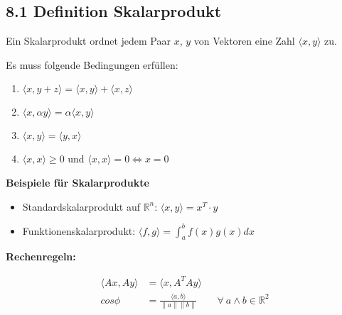 \subsection{8.1 Definition Skalarprodukt}{
\vskip1pt
Ein Skalarprodukt ordnet jedem Paar $x$, $y$ von Vektoren eine Zahl $\langle x, y \rangle$ zu. \par
\vskip5pt

Es muss folgende Bedingungen erfüllen:
\vspace{-1pt}
\begin{center}
\begin{minipage}[t]{0.8 \columnwidth}
\begin{enumerate}[label=\protect\circled{\arabic*}]
\item $\langle x, y + z \rangle = \langle x, y \rangle + \langle x, z \rangle$
\item $\langle x, \alpha y \rangle = \alpha \langle x, y \rangle$
\item $\langle x, y \rangle = \langle y, x \rangle$
\item $\langle x, x \rangle \geq 0$ und $\langle x, x \rangle = 0 \Leftrightarrow x = 0$
\end{enumerate}
\end{minipage}
\end{center}


\vskip4pt
\textbf{Beispiele für Skalarprodukte}
\begin{itemize}[leftmargin=0.29cm, itemsep=0.5pt]
\item Standardskalarprodukt auf $\mathbb{R}^n$: $\langle x, y \rangle = x^T \cdot y$
\item Funktionenskalarprodukt: $\langle f, g \rangle = \int_{a}^{b}f(x) g(x) dx$
\end{itemize}

\vskip2pt
\textbf{Rechenregeln:} \par
\vspace{-3mm}

\hskip5pt
\begin{minipage}[t]{\columnwidth}
\begin{align}
\langle Ax, Ay \rangle &= \langle x, A^TAy \rangle \nonumber \\
cos\phi &= \frac{\langle a, b \rangle}{\|a\| \|b\|} \qquad \forall\: a \land b \in \mathbb{R}^2 \nonumber
\end{align}
\end{minipage}


}
\WhiteSpace
